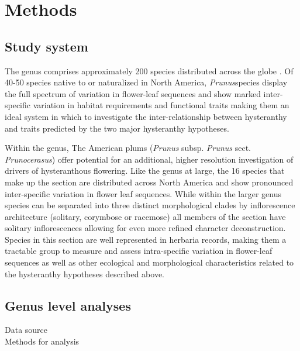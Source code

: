 \documentclass{article}\usepackage[]{graphicx}\usepackage[]{color}
\begin{document}

\section*{Methods}
\subsection{Study system}
\noindent The genus  comprises approximately 200 species distributed across the globe \citep{}. Of 40-50 species native to or naturalized in North America, \textit{Prunus}species display the full spectrum of variation in flower-leaf sequences \citep{} and show marked inter-specific variation in habitat requirements and functional traits making them an ideal system in which to investigate the inter-relationship between hysteranthy and traits predicted by the two major hysteranthy hypotheses.

\noindent Within the genus, The American plums (\textit{Prunus} subsp. \textit{Prunus} sect. \textit{Prunocerasus}) offer potential for an additional, higher resolution investigation of drivers of hysteranthous flowering. Like the genus at large, the 16 species that make up the section are distributed across North America and show pronounced inter-specific variation in flower leaf sequences. While within the larger genus species can be separated into three distinct morphological clades by inflorescence architecture (solitary, corymbose or racemose) all members of the section have solitary inflorescences \citep{} allowing for even more refined character deconstruction. Species in this section are well represented in herbaria records, making them a tractable group to measure and assess intra-specific variation in flower-leaf sequences as well as other ecological and morphological characteristics related to the hysteranthy hypotheses described above. 


\subsection{Genus level analyses}
Data source\\
Methods for analysis\\
\end{document}

